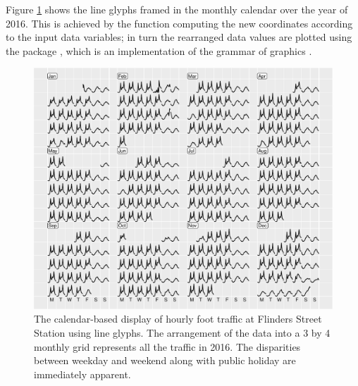 \documentclass[article]{jss}
\theoremstyle{definition}
\theoremstyle{definition}
\theoremstyle{remark}
\begin{document}
Figure \ref{fig:flinders-2016} shows the line glyphs framed in the
monthly calendar over the year of 2016. This is achieved by the
 function computing the new coordinates according
to the input data variables; in turn the rearranged data values are
plotted using the  package \citep{R-ggplot2}, which is an
implementation of the grammar of graphics
\citep{wilkinson2006grammar, wickham2010layered}.

\begin{CodeChunk}
\begin{figure}

{\centering \includegraphics[width=\textwidth]{figure/flinders-2016-1} 

}

\caption[The calendar-based display of hourly foot
traffic at Flinders Street Station using line glyphs. The arrangement of
the data into a 3 by 4 monthly grid represents all the traffic in 2016.
The disparities between weekday and weekend along with public holiday
are immediately apparent.]{The calendar-based display of hourly foot
traffic at Flinders Street Station using line glyphs. The arrangement of
the data into a 3 by 4 monthly grid represents all the traffic in 2016.
The disparities between weekday and weekend along with public holiday
are immediately apparent.}\label{fig:flinders-2016}
\end{figure}
\end{CodeChunk}
\end{document}
